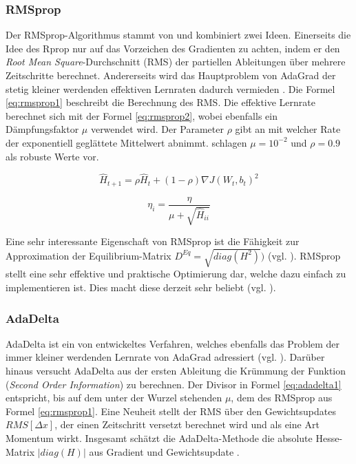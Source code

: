 \subsubsection{RMSprop}
Der RMSprop-Algorithmus stammt von \cite{Hinton2015} und kombiniert zwei Ideen. Einerseits die Idee des Rprop nur auf das Vorzeichen des Gradienten zu achten, indem er den \textit{Root Mean Square}-Durchschnitt (RMS) der partiellen Ableitungen über mehrere Zeitschritte berechnet. Andererseits wird das Hauptproblem von AdaGrad der stetig kleiner werdenden effektiven Lernraten dadurch vermieden \cite[vgl.][Kap. 8.4.1, S. 257]{Bengio2015}. Die Formel \ref{eq:rmsprop1} beschreibt die Berechnung des RMS. Die effektive Lernrate berechnet sich mit der Formel \ref{eq:rmsprop2}, wobei ebenfalls ein Dämpfungsfaktor $\mu$ verwendet wird. Der Parameter $\rho$ gibt an mit welcher Rate der exponentiell geglättete Mittelwert abnimmt. \cite{Dauphin2015} schlagen $\mu = 10^{-2}$ und $\rho = 0.9$ als robuste Werte vor.

\begin{equation}
\label{eq:rmsprop1} 
\hat{H}_{t+1} = \rho \hat{H}_{t} + (1 - \rho) \nabla J(W_t,b_t)^2
\end{equation}


\begin{equation}
\label{eq:rmsprop2} 
\eta_{i} = \frac{\eta}{\mu + \sqrt{\hat{H}_{ii}}}
\end{equation}

Eine sehr interessante Eigenschaft von RMSprop ist die Fähigkeit zur Approximation der Equilibrium-Matrix $D^{Eq} = \sqrt{diag(H^2)})$ (vgl. \cite{Dauphin2015}). RMSprop stellt eine sehr effektive und praktische Optimierung dar, welche dazu einfach zu implementieren ist. Dies macht diese derzeit sehr beliebt (vgl. \cite{Bengio2015}).

\subsubsection{AdaDelta}
AdaDelta ist ein von \cite{Zeiler2012} entwickeltes Verfahren, welches ebenfalls das Problem der immer kleiner werdenden Lernrate von AdaGrad adressiert (vgl. \cite{Bengio2015}). Darüber hinaus versucht AdaDelta aus der ersten Ableitung die Krümmung der Funktion (\textit{Second Order Information}) zu berechnen. Der Divisor in Formel \ref{eq:adadelta1} entspricht, bis auf dem unter der Wurzel stehenden $\mu$, dem des RMSprop aus Formel \ref{eq:rmsprop1}. Eine Neuheit stellt der RMS über den Gewichtsupdates $RMS[\Delta x]$, der einen Zeitschritt versetzt berechnet wird und als eine Art Momentum wirkt. Insgesamt schätzt die AdaDelta-Methode die absolute Hesse-Matrix $|diag(H)|$ aus Gradient und Gewichtsupdate \cite[vgl.][]{Zeiler2012}.


